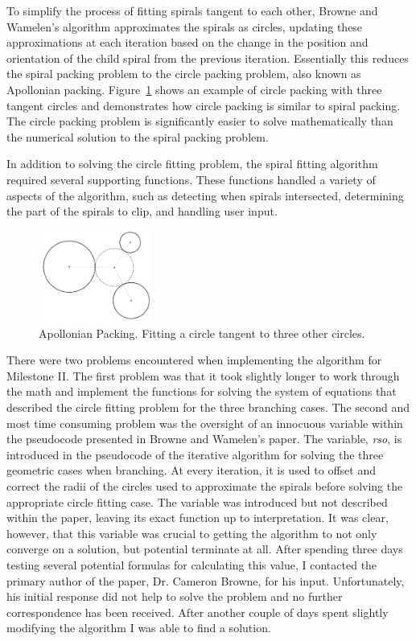 \documentclass[12pt]{article}
\begin{document}
	To simplify the process of fitting spirals tangent to each other, Browne and Wamelen's algorithm approximates the spirals as circles, updating these approximations at each iteration based on the change in the position and orientation of the child spiral from the previous iteration. Essentially this reduces the spiral packing problem to the circle packing problem, also known as Apollonian packing.\cite{Kasner1943} Figure~\ref{fig:circle} shows an example of circle packing with three tangent circles and demonstrates how circle packing is similar to spiral packing. The circle packing problem is significantly easier to solve mathematically than the numerical solution to the spiral packing problem.\cite{Browne2006834, Kasner1943}

	In addition to solving the circle fitting problem, the spiral fitting algorithm required several supporting functions. These functions handled a variety of aspects of the algorithm, such as detecting when spirals intersected, determining the part of the spirals to clip, and handling user input.
	
\begin{figure}[ht]
	\centering
	\includegraphics[width=37mm,height=30mm]{spiral-circles}
	\caption{Apollonian Packing. Fitting a circle tangent to three other circles. \cite{Browne2006834}}
	\label{fig:circle}
\end{figure}

	There were two problems encountered when implementing the algorithm for Milestone II. The first problem was that it took slightly longer to work through the math and implement the functions for solving the system of equations that described the circle fitting problem for the three branching cases. The second and most time consuming problem was the oversight of an innocuous variable within the pseudocode presented in Browne and Wamelen's paper. The variable, \textit{rso}, is introduced in the pseudocode of the iterative algorithm for solving the three geometric cases when branching. At every iteration, it is used to offset and correct the radii of the circles used to approximate the spirals before solving the appropriate circle fitting case. The variable was introduced but not described within the paper, leaving its exact function up to interpretation. It was clear, however, that this variable was crucial to getting the algorithm to not only converge on a solution, but potential terminate at all. After spending three days testing several potential formulas for calculating this value, I contacted the primary author of the paper, Dr. Cameron Browne, for his input. Unfortunately, his initial response did not help to solve the problem and no further correspondence has been received. After another couple of days spent slightly modifying the algorithm I was able to find a solution. 
	
\end{document}
